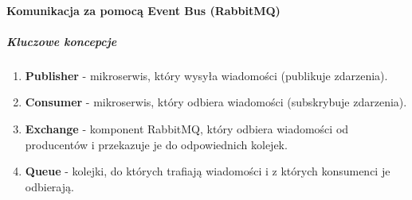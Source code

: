 \paragraph {Komunikacja za pomocą Event Bus (RabbitMQ)}
   
\subparagraph{Kluczowe koncepcje}

\begin{enumerate}
\item {\bf Publisher} - mikroserwis, który wysyła wiadomości (publikuje zdarzenia).
\item {\bf Consumer} - mikroserwis, który odbiera wiadomości (subskrybuje zdarzenia).
\item {\bf Exchange} - komponent RabbitMQ, który odbiera wiadomości od producentów i przekazuje je do odpowiednich kolejek.
\item {\bf Queue} - kolejki, do których trafiają wiadomości i z których konsumenci je odbierają.
\end{enumerate}

